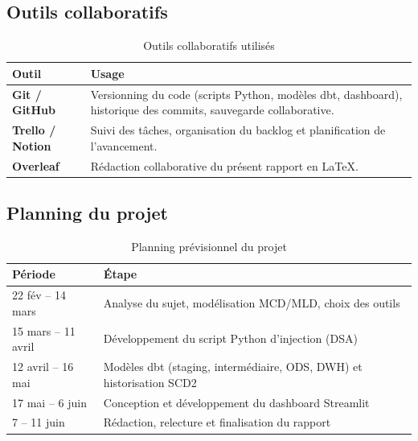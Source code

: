 \documentclass[12pt,a4paper]{article}
\newcommand{\dbt}{dbt}
\begin{document}
\subsection{Outils collaboratifs}

\begin{table}[H]
  \centering
  \begin{tabularx}{\linewidth}{lX}
    \toprule
    \textbf{Outil} & \textbf{Usage} \\
    \midrule
    \textbf{Git / GitHub}    & Versionning du code (scripts Python, modèles \dbt{},
                                dashboard), historique des commits, sauvegarde collaborative. \\
    \textbf{Trello / Notion} & Suivi des tâches, organisation du backlog
                                et planification de l'avancement. \\
    \textbf{Overleaf}        & Rédaction collaborative du présent rapport en \LaTeX{}. \\
    \bottomrule
  \end{tabularx}
  \caption{Outils collaboratifs utilisés}
\end{table}

\subsection{Planning du projet}

\begin{table}[H]
  \centering
  \begin{tabularx}{\linewidth}{lX}
    \toprule
    \textbf{Période} & \textbf{Étape} \\
    \midrule
    22 fév -- 14 mars   & Analyse du sujet, modélisation MCD/MLD, choix des outils \\
    15 mars -- 11 avril & Développement du script Python d'injection (DSA) \\
    12 avril -- 16 mai  & Modèles \dbt{} (staging, intermédiaire, ODS, DWH) et historisation SCD2 \\
    17 mai -- 6 juin    & Conception et développement du dashboard Streamlit \\
    7 -- 11 juin        & Rédaction, relecture et finalisation du rapport \\
    \bottomrule
  \end{tabularx}
  \caption{Planning prévisionnel du projet}
\end{table}
\end{document}
